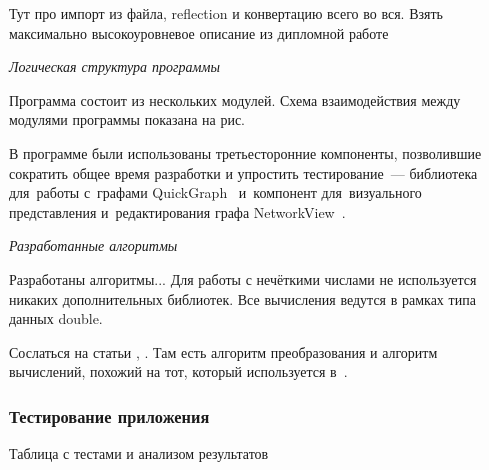 Тут про импорт из файла, reflection и конвертацию всего во вся. Взять максимально высокоуровневое описание из дипломной работе

\textit{Логическая структура программы}

Программа состоит из нескольких модулей. Схема взаимодействия между модулями программы показана на рис.

В программе были использованы третьесторонние компоненты, позволившие сократить общее время разработки и упростить тестирование~--- библиотека для~работы с~графами QuickGraph~\cite{QuickGraph_Codeplex, QuickGraph_CodeProject} и~компонент для~визуального представления и~редактирования графа NetworkView~\cite{NetworkView_CodeProject}.

\textit{Разработанные алгоритмы}

Разработаны алгоритмы...
Для работы с нечёткими числами не используется никаких дополнительных библиотек. Все вычисления ведутся в рамках типа данных double.

Сослаться на статьи \cite{PMTYMM}, \cite{VSU-5y}. Там есть алгоритм преобразования и алгоритм вычислений, похожий на тот, который используется в~\cite{Kruglov_Balashov}.

\subsubsection*{Тестирование приложения}


Таблица с тестами и анализом результатов